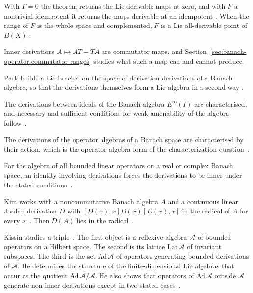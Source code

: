 With $F=0$ the theorem returns the Lie derivable maps at zero, and with $F$ a
nontrivial idempotent it returns the maps derivable at an idempotent
\cite[Remark~2.4, p.~15]{LiuHou2025Lie}. When the range of $F$ is the whole
space and complemented, $F$ is a Lie all-derivable point of $B(X)$
\cite[Corollary~2.3, p.~14]{LiuHou2025Lie}.

Inner derivations $A\mapsto AT-TA$ are commutator maps, and
Section~\ref{sec:banach-operator:commutator-ranges} studies what such a
map can and cannot produce.

Park builds a Lie bracket on the space of derivation-derivations of a Banach
algebra, so that the derivations themselves form a Lie algebra in a second way
\cite[Abstract, p.~1]{Park2019LieBracket}.

The derivations between ideals of the Banach algebra $E^\infty(I)$ are
characterised, and necessary and sufficient conditions for weak amenability of
the algebra follow~\cite{WlDerivationsOnMatrixAlgebrasWit2019}.

The derivations of the operator algebras of a Banach space are characterised
by their action, which is the operator-algebra form of the characterization
question~\cite{WlCharacterizationsOfDerivations2010}.

For the algebra of all bounded linear operators on a real or complex Banach
space, an identity involving derivations forces the derivations to
be inner under the stated
conditions~\cite{WlAnIdentityRelatedToDerivations2018}.

Kim works with a noncommutative Banach algebra $A$ and a continuous linear
Jordan derivation $D$ with $[D(x),x]D(x)[D(x),x]$ in the radical of $A$ for
every $x$~\cite{WlOnTheDerivationsOfSemiprimeRin2000}. Then $D(A)$ lies in the
radical~\cite{WlOnTheDerivationsOfSemiprimeRin2000}.

Kissin studies a triple~\cite{WlOnSomeReflexiveAlgebrasOfOpera1984}. The first object is a reflexive algebra
$\mathcal{A}$ of bounded operators on a Hilbert space. The second is its %
lattice $\mathrm{Lat}\,\mathcal{A}$ of invariant subspaces. The third is the
set $\mathrm{Ad}\,\mathcal{A}$ of operators generating bounded derivations of
$\mathcal{A}$. He determines the structure of
the finite-dimensional Lie algebras that occur as the quotient
$\mathrm{Ad}\,\mathcal{A}/\mathcal{A}$. He also shows that operators of
$\mathrm{Ad}\,\mathcal{A}$ outside $\mathcal{A}$ generate non-inner
derivations except in two stated
cases~\cite{WlOnSomeReflexiveAlgebrasOfOpera1984}.

